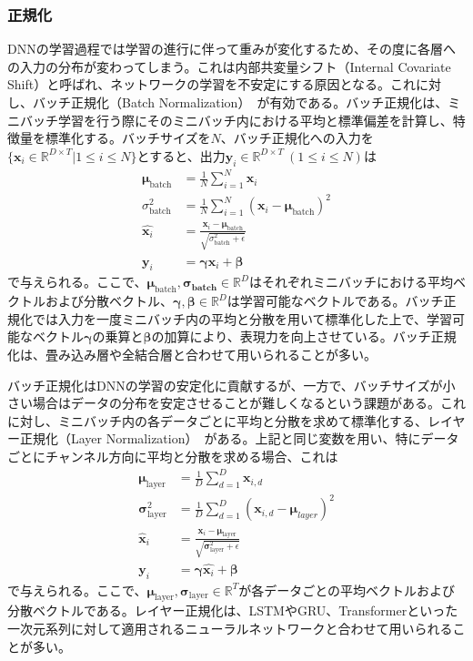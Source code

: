 \documentclass[12pt]{jarticle}
\numberwithin{equation}{section}    %
\numberwithin{figure}{section}      %
\numberwithin{table}{section}      %
\begin{document}
\subsubsection{正規化}
DNNの学習過程では学習の進行に伴って重みが変化するため、その度に各層への入力の分布が変わってしまう。これは内部共変量シフト（Internal Covariate Shift）と呼ばれ、ネットワークの学習を不安定にする原因となる。これに対し、バッチ正規化（Batch Normalization）~\cite{ioffe2015batch}が有効である。バッチ正規化は、ミニバッチ学習を行う際にそのミニバッチ内における平均と標準偏差を計算し、特徴量を標準化する。バッチサイズを$N$、バッチ正規化への入力を$\{ \bm{x}_{i} \in \mathbb{R}^{D \times T} | 1 \le i \le N \}$とすると、出力$\bm{y}_{i} \in \mathbb{R}^{D \times T} ~ (1 \le i \le N)$は
\begin{align}
    \bm{\mu}_{\text{batch}}   & = \frac{1}{N} \sum_{i = 1}^{N} \bm{x}_{i}                                                  \\
    \sigma_{\text{batch}}^{2} & = \frac{1}{N} \sum_{i = 1}^{N} (\bm{x}_{i} - \bm{\mu}_{\text{batch}})^{2}                  \\
    \hat{\bm{x}_{i}}          & = \frac{\bm{x}_{i} - \bm{\mu}_{\text{batch}}}{\sqrt{\sigma_{\text{batch}}^{2} + \epsilon}} \\
    \bm{y}_{i}                & = \bm{\gamma} \hat{\bm{x}_{i}} + \bm{\beta}
\end{align}
で与えられる。ここで、$\bm{\mu}_{\text{batch}}, \bm{\sigma_{\text{batch}}} \in \mathbb{R}^{D}$はそれぞれミニバッチにおける平均ベクトルおよび分散ベクトル、$\bm{\gamma}, \bm{\beta} \in \mathbb{R}^{D}$は学習可能なベクトルである。バッチ正規化では入力を一度ミニバッチ内の平均と分散を用いて標準化した上で、学習可能なベクトル$\bm{\gamma}$の乗算と$\bm{\beta}$の加算により、表現力を向上させている。バッチ正規化は、畳み込み層や全結合層と合わせて用いられることが多い。

バッチ正規化はDNNの学習の安定化に貢献するが、一方で、バッチサイズが小さい場合はデータの分布を安定させることが難しくなるという課題がある。これに対し、ミニバッチ内の各データごとに平均と分散を求めて標準化する、レイヤー正規化（Layer Normalization）~\cite{ba2016layer}がある。上記と同じ変数を用い、特にデータごとにチャンネル方向に平均と分散を求める場合、これは
\begin{align}
    \bm{\mu}_{\text{layer}}        & = \frac{1}{D} \sum_{d = 1}^{D} \bm{x}_{i, d}                                                     \\
    \bm{\sigma}_{\text{layer}}^{2} & = \frac{1}{D} \sum_{d = 1}^{D} (\bm{x}_{i, d} - \bm{\mu}_{layer})^{2}                            \\
    \hat{\bm{x}}_{i}               & = \frac{\bm{x}_{i} - \bm{\mu}_{\text{layer}}}{\sqrt{\bm{\sigma}_{\text{layer}}^{2}  + \epsilon}} \\
    \bm{y}_{i}                     & = \bm{\gamma} \hat{\bm{x}_{i}} + \bm{\beta}
\end{align}
で与えられる。ここで、$\bm{\mu}_{\text{layer}}, \bm{\sigma}_{\text{layer}} \in \mathbb{R}^{T}$が各データごとの平均ベクトルおよび分散ベクトルである。レイヤー正規化は、LSTMやGRU、Transformerといった一次元系列に対して適用されるニューラルネットワークと合わせて用いられることが多い。
\end{document}
